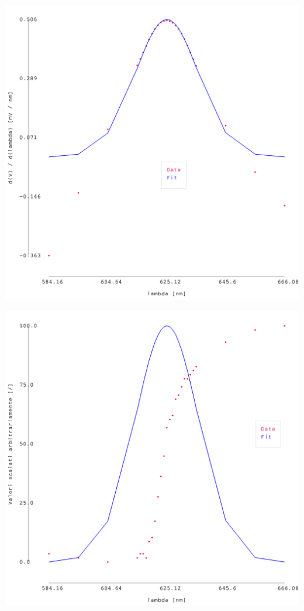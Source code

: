 \documentclass{article}
\begin{document}
\begin{center}
    \begin{minipage}{0.25\textwidth}        
        \includegraphics[width=1\linewidth]{../images/grafico1_1.png}
    \end{minipage}
    \hfill
    \begin{minipage}{0.25\textwidth}        
        \includegraphics[width=1\linewidth]{../images/grafico3_1.png}

\end{minipage}
\end{center}
\end{document}
